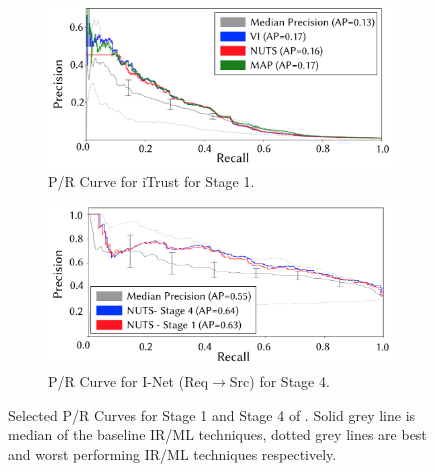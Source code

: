 \begin{figure}[h]
\centering

\begin{subfigure}{0.5\textwidth}
\includegraphics[clip,width=\textwidth]{graphics/chap_04-bayes/fig3_Stage1-single.pdf}
\caption{\footnotesize P/R Curve for iTrust for Stage 1.}
\label{fig:pr1-results}
\end{subfigure}

\begin{subfigure}{0.5\textwidth}
\includegraphics[clip,width=\textwidth]{graphics/chap_04-bayes/fig4_Stage4-single.pdf}
\caption{\footnotesize P/R Curve for I-Net (Req$\rightarrow$Src) for Stage 4.}
\label{fig:pr4-results}
\end{subfigure}

\caption{\footnotesize Selected P/R Curves for Stage 1 and Stage 4 of \Comet.  Solid grey line is median of the baseline IR/ML techniques, dotted grey lines are best and worst performing IR/ML techniques respectively.}

\end{figure}

